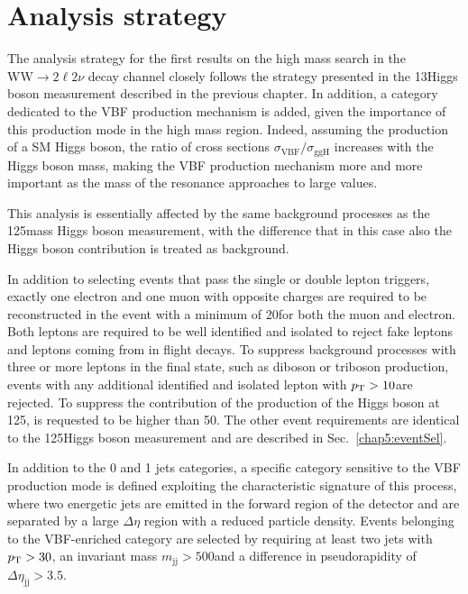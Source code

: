 \section{Analysis strategy}\label{chap6:AnalysisStrategy}

The analysis strategy for the first results on the high mass search in the $\mathrm{WW}\to2\ell2\nu$ decay channel closely follows the strategy presented in the 13\TeV Higgs boson measurement described in the previous chapter. In addition, a category dedicated to the VBF production mechanism is added, given the importance of this production mode in the high mass region. Indeed, assuming the production of a SM Higgs boson, the ratio of cross sections $\sigma_\mathrm{VBF}/\sigma_\mathrm{ggH}$ increases with the Higgs boson mass, making the VBF production mechanism more and more important as the mass of the resonance approaches to large values.

This analysis is essentially affected by the same background processes as the 125\GeV mass Higgs boson measurement, with the difference that in this case also the Higgs boson contribution is treated as background.

In addition to selecting events that pass the single or double lepton triggers, exactly one electron and one muon with opposite charges are required to be reconstructed in the event with a minimum \pt of 20\GeV for both the muon and electron. Both leptons are
required to be well identified and isolated to reject fake leptons and leptons
coming from in flight decays. To suppress background processes with three or more leptons in the final state, such as diboson or triboson production, events with any additional identified and isolated 
lepton with $p_\mathrm{T}>10$\GeV are rejected. To suppress the contribution of the production of the Higgs boson at 125\GeV, \mll is requested to be higher than 50\GeV. The other event requirements are identical to the 125\GeV Higgs boson measurement and are described in Sec.~\ref{chap5:eventSel}.

In addition to the 0 and 1 jets categories, a specific category sensitive to the VBF production mode is defined exploiting the characteristic signature of this process, where two energetic jets are emitted in the forward region of the detector and are separated by a large $\Delta\eta$ region with a reduced particle density. Events belonging to the VBF-enriched category are selected by requiring at least two jets with $p_\mathrm{T}>30$\GeV, an invariant mass $m_\mathrm{jj}>500$\GeV and a difference in pseudorapidity of $\Delta\eta_\mathrm{jj}>3.5$.

